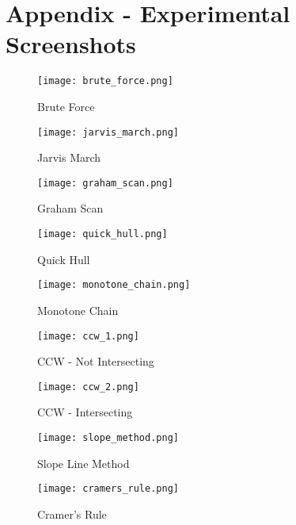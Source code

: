 \documentclass[10pt,twocolumn]{article}
\begin{document}
\onecolumn

\section{Appendix - Experimental Screenshots}
        \begin{figure}[h]
            \centering
            \texttt{[image: brute\_force.png]}
            \caption{Brute Force}
            \label{fig:brute-force}
        \end{figure}
        
        \begin{figure}[h]
            \centering
            \texttt{[image: jarvis\_march.png]}
            \caption{Jarvis March}
            \label{fig:jarvis-march}
        \end{figure}
    
        \begin{figure}[h]
            \centering
            \texttt{[image: graham\_scan.png]}
            \caption{Graham Scan}
            \label{fig:graham-scan}
        \end{figure}
    
        \begin{figure}[h]
            \centering
            \texttt{[image: quick\_hull.png]}
            \caption{Quick Hull}
            \label{fig:quick-hull}
        \end{figure}
    
        \begin{figure}[h]
            \centering
            \texttt{[image: monotone\_chain.png]}
            \caption{Monotone Chain}
            \label{fig:monotone-chain}
        \end{figure}

    \begin{figure}[h]
        \centering
        \texttt{[image: ccw\_1.png]}
        \caption{CCW - Not Intersecting }
        \label{fig:enter-label}
    \end{figure}
    \begin{figure}[h]
        \centering
        \texttt{[image: ccw\_2.png]}
        \caption{CCW - Intersecting}
        \label{fig:enter-label}
    \end{figure}
    \begin{figure}[h]
        \centering
        \texttt{[image: slope\_method.png]}
        \caption{Slope Line Method}
        \label{fig:enter-label}
    \end{figure}
    \begin{figure}[h]
        \centering
        \texttt{[image: cramers\_rule.png]}
        \caption{Cramer's Rule}
        \label{fig:enter-label}
    \end{figure}
\end{document}
